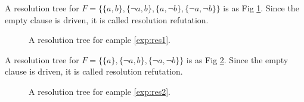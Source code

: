 \documentclass[12pt]{book}
\begin{document}
 \begin{examp}\label{exp:res1}
      A resolution tree for $F = \{\{a,b\},\{\neg a,b\},\{a, \neg b\},\{\neg a, \neg b\}\}$ is as Fig \ref{fig:resol1}. Since the empty clause 
	  is driven, it is called resolution refutation.
	   \begin{figure}
	   \centering  
	   \caption{A resolution tree for eample  \ref{exp:res1}.}
	   \label{fig:resol1}
       \end{figure}
\end{examp}

\begin{examp}\label{exp:res2}
      A resolution tree for $F = \{\{a\},\{\neg a,b\},\{\neg a, \neg b\}\}$ is as Fig \ref{fig:resol2}. Since the empty clause 
	  is driven, it is called resolution refutation.
	  \begin{figure}[h]
       \centering
	   \caption{A resolution tree for eample  \ref{exp:res2}.}
	   \label{fig:resol2}
       \end{figure}
\end{examp}
 
\end{document}
